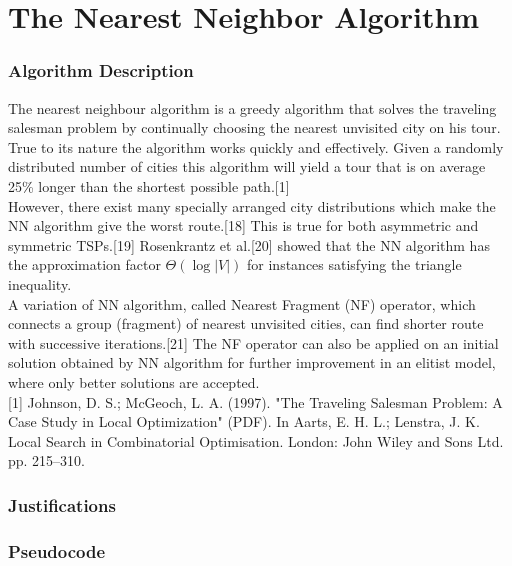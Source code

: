 \documentclass[Group45_Project_Report.tex]{subfiles}
\begin{document}
\part*{The Nearest Neighbor Algorithm}

\section*{Algorithm Description}
The nearest neighbour algorithm is a greedy algorithm that solves the traveling salesman problem by continually choosing the nearest unvisited city on his tour. True to its nature the algorithm works quickly and effectively. Given a randomly distributed number of cities this algorithm will yield a tour that is on average 25\% longer than the shortest possible path.[1] 
\\[.25cm]
However, there exist many specially arranged city distributions which make the NN algorithm give the worst route.[18] This is true for both asymmetric and symmetric TSPs.[19] Rosenkrantz et al.[20] showed that the NN algorithm has the approximation factor $\Theta (\log |V|)$ for instances satisfying the triangle inequality. 
\\[.25cm]
A variation of NN algorithm, called Nearest Fragment (NF) operator, which connects a group (fragment) of nearest unvisited cities, can find shorter route with successive iterations.[21] The NF operator can also be applied on an initial solution obtained by NN algorithm for further improvement in an elitist model, where only better solutions are accepted.
\\[.25cm]
[1] Johnson, D. S.; McGeoch, L. A. (1997). "The Traveling Salesman Problem: A Case Study in Local Optimization" (PDF). In Aarts, E. H. L.; Lenstra, J. K. Local Search in Combinatorial Optimisation. London: John Wiley and Sons Ltd. pp. 215–310.

\section*{Justifications}

\section*{Pseudocode}

\newpage
\end{document}
